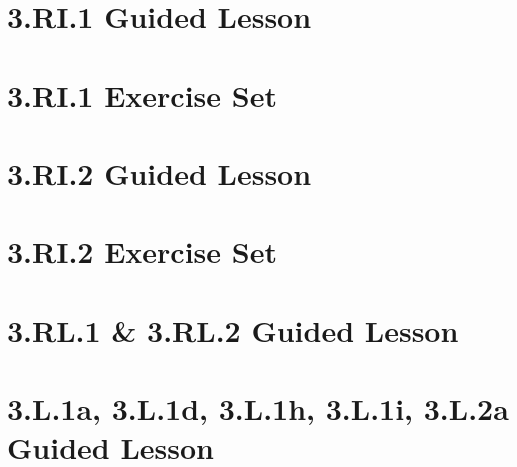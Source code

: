 \documentclass[a4paper,12pt]{article}
\title{}
\date{}
\begin{document}

\hypertarget{toc}{}  %
\tableofcontents
\newpage

\newpage
\section{3.RI.1 Guided Lesson}


\newpage
\section{3.RI.1 Exercise Set}


\newpage
\section{3.RI.2 Guided Lesson}


\newpage
\section{3.RI.2 Exercise Set}


\newpage
\section{3.RL.1 \& 3.RL.2 Guided Lesson}


% 

\newpage
\section{3.L.1a, 3.L.1d, 3.L.1h, 3.L.1i, 3.L.2a Guided Lesson}




\end{document}
